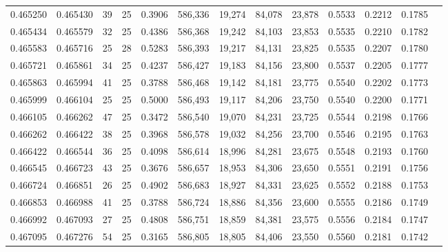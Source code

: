 \begin{tabular}{rrrrrrrrrrrrr}
0.465250 & 0.465430 &    39 &  25 &                                     0.3906 & 586,336 &  19,274 &  84,078 &  23,878 & 0.5533 & 0.2212 & 0.1785 \\
0.465434 & 0.465579 &    32 &  25 &                                     0.4386 & 586,368 &  19,242 &  84,103 &  23,853 & 0.5535 & 0.2210 & 0.1782 \\
0.465583 & 0.465716 &    25 &  28 &                                     0.5283 & 586,393 &  19,217 &  84,131 &  23,825 & 0.5535 & 0.2207 & 0.1780 \\
0.465721 & 0.465861 &    34 &  25 &                                     0.4237 & 586,427 &  19,183 &  84,156 &  23,800 & 0.5537 & 0.2205 & 0.1777 \\
0.465863 & 0.465994 &    41 &  25 &                                     0.3788 & 586,468 &  19,142 &  84,181 &  23,775 & 0.5540 & 0.2202 & 0.1773 \\
0.465999 & 0.466104 &    25 &  25 &                                     0.5000 & 586,493 &  19,117 &  84,206 &  23,750 & 0.5540 & 0.2200 & 0.1771 \\
0.466105 & 0.466262 &    47 &  25 &                                     0.3472 & 586,540 &  19,070 &  84,231 &  23,725 & 0.5544 & 0.2198 & 0.1766 \\
0.466262 & 0.466422 &    38 &  25 &                                     0.3968 & 586,578 &  19,032 &  84,256 &  23,700 & 0.5546 & 0.2195 & 0.1763 \\
0.466422 & 0.466544 &    36 &  25 &                                     0.4098 & 586,614 &  18,996 &  84,281 &  23,675 & 0.5548 & 0.2193 & 0.1760 \\
0.466545 & 0.466723 &    43 &  25 &                                     0.3676 & 586,657 &  18,953 &  84,306 &  23,650 & 0.5551 & 0.2191 & 0.1756 \\
0.466724 & 0.466851 &    26 &  25 &                                     0.4902 & 586,683 &  18,927 &  84,331 &  23,625 & 0.5552 & 0.2188 & 0.1753 \\
0.466853 & 0.466988 &    41 &  25 &                                     0.3788 & 586,724 &  18,886 &  84,356 &  23,600 & 0.5555 & 0.2186 & 0.1749 \\
0.466992 & 0.467093 &    27 &  25 &                                     0.4808 & 586,751 &  18,859 &  84,381 &  23,575 & 0.5556 & 0.2184 & 0.1747 \\
0.467095 & 0.467276 &    54 &  25 &                                     0.3165 & 586,805 &  18,805 &  84,406 &  23,550 & 0.5560 & 0.2181 & 0.1742 \\

\end{tabular}
